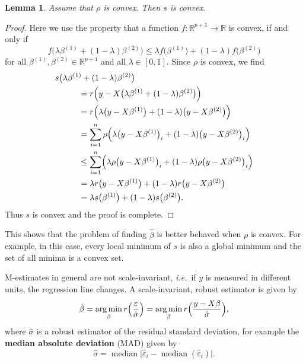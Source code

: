 \documentclass[
  a4paper,
]{article}
\newtheorem{lemma}{Lemma}[section]
\theoremstyle{definition}
\theoremstyle{definition}
\theoremstyle{definition}
\theoremstyle{definition}
\theoremstyle{remark}
\begin{document}
\begin{lemma}
Assume that \(\rho\) is convex. Then \(s\) is convex.
\end{lemma}

\begin{proof}
Here we use the property that a function \(f\colon \mathbb{R}^{p+1} \to \mathbb{R}\) is convex,
if and only if
\begin{equation*}
  f\bigl( \lambda \beta^{(1)} + (1 - \lambda) \beta^{(2)} \bigr)
  \leq \lambda f\bigl( \beta^{(1)} \bigr) + (1 - \lambda) f\bigl( \beta^{(2)} \bigr)
\end{equation*}
for all \(\beta^{(1)}, \beta^{(2)}\in \mathbb{R}^{p+1}\) and all \(\lambda \in [0, 1]\).
Since \(\rho\) is convex, we find
\begin{align*}
  \hskip1cm&\hskip-1cm
  s\bigl( \lambda \beta^{(1)} + (1 - \lambda) \beta^{(2)} \bigr) \\
  &= r\Bigl( y - X \bigl(\lambda \beta^{(1)} + (1 - \lambda) \beta^{(2)} \bigr) \Bigr) \\
  &= r\Bigl( \lambda \bigl( y - X \beta^{(1)} \bigr)
    + (1 - \lambda) \bigl( y - X \beta^{(2)} \bigr) \Bigr) \\
  &= \sum_{i=1}^n \rho \Bigl( \lambda \bigl( y - X \beta^{(1)} \bigr)_i
    + (1 - \lambda) \bigl( y - X \beta^{(2)} \bigr)_i \Bigr) \\
  &\leq \sum_{i=1}^n \Bigl( \lambda \rho \bigl( y - X \beta^{(1)} \bigr)_i
    + (1 - \lambda) \rho \bigl( y - X \beta^{(2)} \bigr)_i \Bigr) \\
  &= \lambda r\bigl( y - X \beta^{(1)} \bigr)
    + (1 - \lambda) r\bigl( y - X \beta^{(2)} \bigr) \\
  &= \lambda s\bigl( \beta^{(1)} \bigr) + (1 - \lambda) s\bigl( \beta^{(2)} \bigr).
\end{align*}
Thus \(s\) is convex and the proof is complete.
\end{proof}

This shows that the problem of finding \(\hat\beta\) is better behaved when
\(\rho\) is convex. For example, in this case, every local minimum of \(s\) is
also a global minimum and the set of all minima is a convex set.

M-estimates in general are not scale-invariant, \emph{i.e.}~if \(y\) is measured
in different units, the regression line changes. A scale-invariant, robust
estimator is given by
\begin{equation*}
  \hat\beta
  = \mathop{\mathrm{arg\,min}}\limits_\beta r\Bigl( \frac{\varepsilon}{\hat\sigma} \Bigr)
  = \mathop{\mathrm{arg\,min}}\limits_\beta r\Bigl( \frac{y - X\beta}{\hat\sigma} \Bigr),
\end{equation*}
where \(\hat \sigma\) is a robust estimator of the residual standard deviation,
for example the \textbf{median absolute deviation} (MAD) given by
\begin{equation*}
  \hat\sigma
  = \mathop{\mathrm{median}}\bigl| \hat\varepsilon_i - \mathop{\mathrm{median}}(\hat\varepsilon_i) \bigr|.
\end{equation*}
\end{document}
